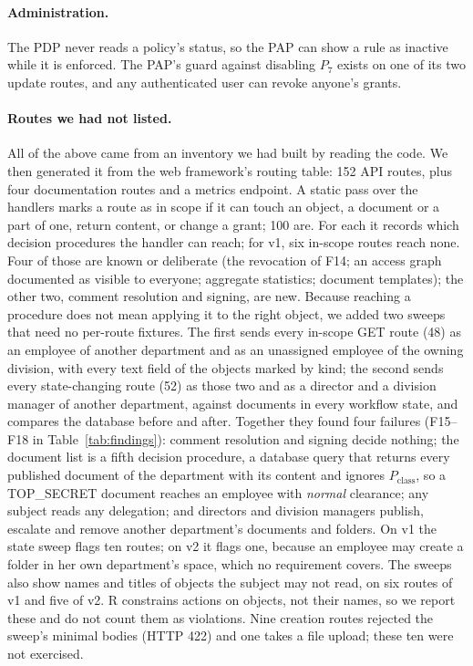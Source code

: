 \documentclass[sigconf,review,anonymous]{acmart}
\newcommand{\Pc}{P_{\mathrm{class}}}
\begin{document}
\paragraph{Administration.} The PDP never reads a policy's status, so the PAP can show a rule as inactive while
it is enforced. The PAP's guard against disabling $P_7$ exists on one of its two update routes, and any
authenticated user can revoke anyone's grants.

\paragraph{Routes we had not listed.} All of the above came from an inventory we had built by reading the code.
We then generated it from the web framework's routing table: 152 API routes, plus four documentation routes and a
metrics endpoint. A static pass over the handlers marks a route as in scope if it can touch an object, a document
or a part of one, return content, or change a grant; 100 are. For each it records which decision procedures the
handler can reach; for v1, six in-scope routes reach none. Four of those are known or deliberate (the revocation
of F14; an access graph documented as visible to everyone; aggregate statistics; document templates); the other
two, comment resolution and signing, are new. Because reaching a procedure does not
mean applying it to the right object, we added two sweeps that need no per-route fixtures. The first sends every
in-scope GET route (48) as an employee of another department and as an unassigned employee of the owning
division, with every text field of the objects marked by kind; the second sends every state-changing route (52)
as those two and as a director and a division manager of another department, against documents in every workflow
state, and compares the database before and after. Together they found four failures (F15--F18 in
Table~\ref{tab:findings}): comment resolution and signing decide nothing; the document list is a fifth decision
procedure, a database query that returns every published document of the department with its content and
ignores $\Pc$, so a TOP\_SECRET document reaches an employee with \emph{normal} clearance; any subject reads any
delegation; and directors and division managers publish, escalate and remove another department's documents and
folders. On v1 the state sweep flags ten routes; on v2 it flags one, because an employee may create a folder in
her own department's space, which no requirement covers. The sweeps also show names and titles of objects the
subject may not read, on six routes of v1 and five of v2. R constrains actions on objects, not their names, so we report these and do not count them as
violations. Nine creation
routes rejected the sweep's minimal bodies (HTTP 422) and one takes a file upload; these ten were not exercised.
\end{document}
